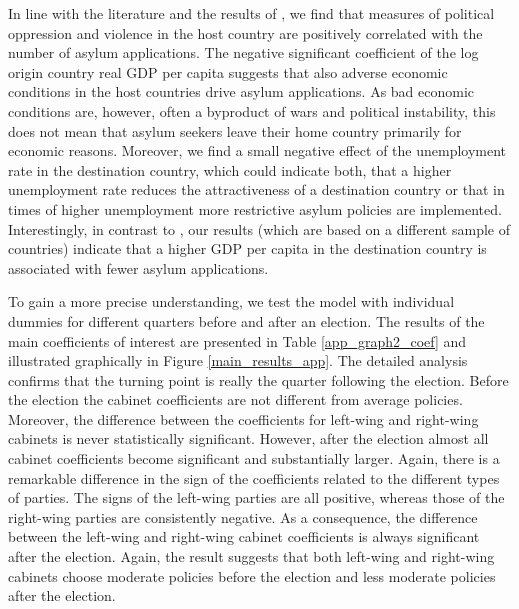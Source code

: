 \documentclass[a4paper,12pt]{article}
\begin{document}
In line with the literature and the results of \citet{hatton2016}, we find that measures of political oppression and violence in the host country are positively correlated with the number of asylum applications. The negative significant coefficient of the log origin country real GDP per capita suggests that also adverse economic conditions in the host countries drive asylum applications. As bad economic conditions are, however, often a byproduct of wars and political instability, this does not mean that asylum seekers leave their home country primarily for economic reasons. Moreover, we find a small negative effect of the unemployment rate in the destination country, which could indicate both, that a higher unemployment rate reduces the attractiveness of a destination country or that in times of higher unemployment more restrictive asylum policies are implemented. Interestingly, in contrast to \citet{hatton2016}, our results (which are based on a different sample of countries) indicate that a higher GDP per capita in the destination country is associated with fewer asylum applications. 

To gain a more precise understanding, we test the model with individual dummies for different quarters before and after an election. The results of the main coefficients of interest are presented in Table \ref{app_graph2_coef} and illustrated graphically in Figure \ref{main_results_app}. The detailed analysis confirms that the turning point is really the quarter following the election. Before the election the cabinet coefficients are not different from average policies. Moreover, the difference between the coefficients for left-wing and right-wing cabinets is never statistically significant. However, after the election almost all cabinet coefficients become significant and substantially larger. Again, there is a remarkable difference in the sign of the coefficients related to the different types of parties. The signs of the left-wing parties are all positive, whereas those of the right-wing parties are consistently negative. As a consequence, the difference between the left-wing and right-wing cabinet coefficients is always significant after the election. Again, the result suggests that both left-wing and right-wing cabinets choose moderate policies before the election and less moderate policies after the election. 
\end{document}
